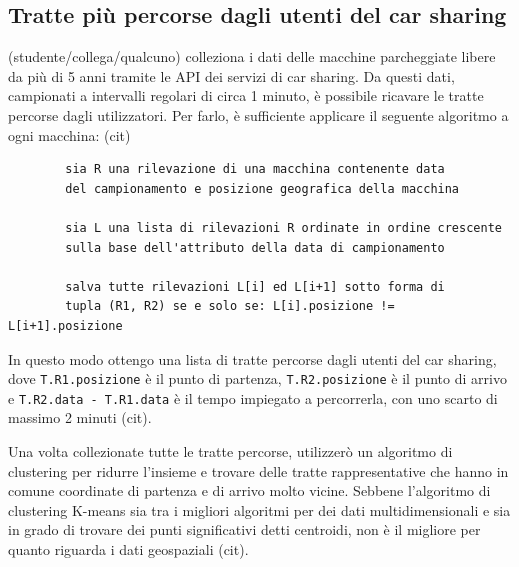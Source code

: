 \documentclass[a4paper]{report}
\begin{document}
	\subsection{Tratte più percorse dagli utenti del car sharing}
	(studente/collega/qualcuno) colleziona i dati delle macchine parcheggiate libere da più di 5 anni tramite le API dei servizi di car sharing. Da questi dati, campionati a intervalli regolari di circa 1 minuto, è possibile ricavare le tratte percorse dagli utilizzatori. Per farlo, è sufficiente applicare il seguente algoritmo a ogni macchina: (cit)
	\begin{verbatim}
		sia R una rilevazione di una macchina contenente data
		del campionamento e posizione geografica della macchina
		
		sia L una lista di rilevazioni R ordinate in ordine crescente
		sulla base dell'attributo della data di campionamento
		
		salva tutte rilevazioni L[i] ed L[i+1] sotto forma di
		tupla (R1, R2) se e solo se: L[i].posizione != L[i+1].posizione
	\end{verbatim}
	In questo modo ottengo una lista di tratte percorse dagli utenti del car sharing, dove \texttt{T.R1.posizione} è il punto di partenza, \texttt{T.R2.posizione} è il punto di arrivo e \texttt{T.R2.data - T.R1.data} è il tempo impiegato a percorrerla, con uno scarto di massimo 2 minuti (cit).
	
	Una volta collezionate tutte le tratte percorse, utilizzerò un algoritmo di clustering per ridurre l'insieme e trovare delle tratte rappresentative che hanno in comune coordinate di partenza e di arrivo molto vicine. Sebbene l'algoritmo di clustering K-means sia tra i migliori algoritmi per dei dati multidimensionali e sia in grado di trovare dei punti significativi detti centroidi, non è il migliore per quanto riguarda i dati geospaziali (cit).
	
\end{document}
